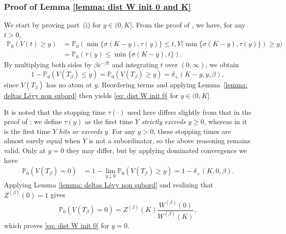 \documentclass[reqno,12pt]{amsart}
\begin{document}
{\iffalse
\subsubsection*{Proof of Lemma \ref{lemma: dist W init 0 and K}}
We start by proving part~(i) for $y\in(0,K]$. From the proof of \cite[Proposition XIV.3.7]{ASM2}, we have, for any $t>0$,
\begin{align*}
    \mathbb{P}_0\left(V(t) \geqslant y\right) &=  \mathbb{P}_0\left(\min\{\sigma(K-y), \tau(y)\}\leqslant t, Y(\min\{\sigma(K-y), \tau(y)\}\right) \geqslant y)\\
    &= \mathbb{P}_0\left(\tau(y)\leqslant\min\{\sigma(K-y), t\}\right).
\end{align*}
By multiplying both sides by $\beta e^{-\beta t}$ and integrating $t$ over $(0,\infty)$, we obtain
\begin{equation*}
    1 - \mathbb{P}_0\left(V(T_\beta) \leqslant y\right) = \mathbb{P}_0\left(V(T_{\beta}) \geqslant y\right) = \delta_+(K-y, y, \beta),
\end{equation*}
since $V(T_\beta)$ has no atom at $y$. Reordering terms and applying Lemma~\ref{lemma: deltas Lévy non subord} then yields \eqref{eq: dist W init 0} for $y\in(0,K]$.

It is noted that the stopping time $\tau(\cdot)$ used here differs slightly from that in the proof of \cite[Proposition XIV.3.7]{ASM2}: we define $\tau(y)$ as the first time $Y$ \emph{strictly exceeds} $y \geqslant 0$, whereas in \cite{ASM2} it is the first time $Y$ \emph{hits or exceeds} $y$. For any $y>0$, these stopping times are almost surely equal when $Y$ is not a subordinator, so the above reasoning remains valid. Only at $y=0$  they may differ, but by applying dominated convergence we have
\begin{align*}
    \mathbb{P}_0\left(V(T_\beta) = 0\right) &= 1 - \lim_{y \downarrow 0} \mathbb{P}_0\left(V(T_\beta) \geqslant y\right) = 1 - \delta_+(K,0,\beta).
\end{align*}
Applying Lemma \ref{lemma: deltas Lévy non subord} and realizing that $Z^{(\beta)}(0) = 1$ gives
\begin{equation*} 
    \mathbb{P}_0\left(V(T_\beta) = 0\right) = Z^{(\beta)}(K)\frac{W^{(\beta)}(0)}{W^{(\beta)}(K)},
\end{equation*}
which proves \eqref{eq: dist W init 0} for $y=0$.

}
\end{document}
